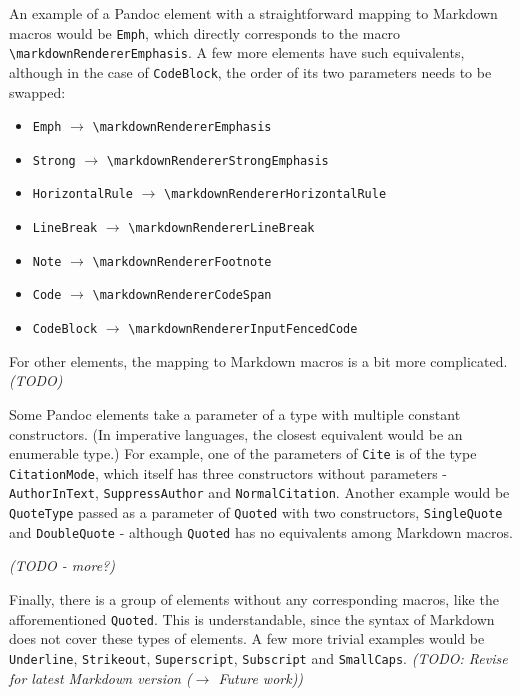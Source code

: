 \documentclass[
  digital,     %
  oneside,     %
  nosansbold,  %
  nocolorbold, %
  lof,         %
  lot,         %
]{fithesis4}
\newcommand{\renderer}[1]{\texttt{\textbackslash{}markdownRenderer{#1}}}
\begin{document}
An example of a Pandoc element with a straightforward mapping to Markdown macros would be \texttt{Emph}, which directly corresponds to the macro \renderer{Emphasis}. A few more elements have such equivalents, although in the case of \texttt{CodeBlock}, the order of its two parameters needs to be swapped:

\begin{itemize}
\item \texttt{Emph} $\rightarrow$ \renderer{Emphasis}
\item \texttt{Strong} $\rightarrow$ \renderer{StrongEmphasis}
\item \texttt{HorizontalRule} $\rightarrow$ \renderer{HorizontalRule}
\item \texttt{LineBreak} $\rightarrow$ \renderer{LineBreak}
\item \texttt{Note} $\rightarrow$ \renderer{Footnote}
\item \texttt{Code} $\rightarrow$ \renderer{CodeSpan}
\item \texttt{CodeBlock} $\rightarrow$ \renderer{InputFencedCode}
\end{itemize}

For other elements, the mapping to Markdown macros is a bit more complicated. \emph{(TODO)}

Some Pandoc elements take a parameter of a type with multiple constant constructors. (In imperative languages, the closest equivalent would be an enumerable type.) For example, one of the parameters of \texttt{Cite} is of the type \texttt{CitationMode}, which itself has three constructors without parameters - \texttt{AuthorInText}, \texttt{SuppressAuthor} and \texttt{NormalCitation}. Another example would be \texttt{QuoteType} passed as a parameter of \texttt{Quoted} with two constructors, \texttt{SingleQuote} and \texttt{DoubleQuote} - although \texttt{Quoted} has no equivalents among Markdown macros.

\emph{(TODO - more?)}

Finally, there is a group of elements without any corresponding macros, like the afforementioned \texttt{Quoted}. This is understandable, since the syntax of Markdown does not cover these types of elements. A few more trivial examples would be \texttt{Underline}, \texttt{Strikeout}, \texttt{Superscript}, \texttt{Subscript} and \texttt{SmallCaps}. \emph{(TODO: Revise for latest Markdown version ($\rightarrow$ Future work))}
\end{document}
